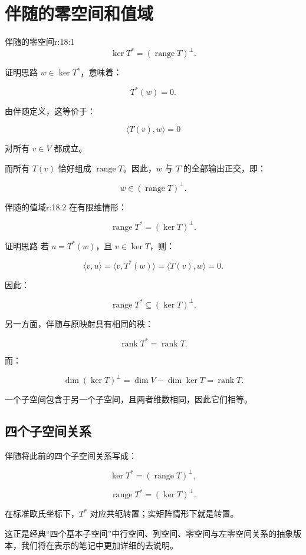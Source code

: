 
\chapter{伴随的零空间和值域}


\begin{jprop}{伴随的零空间}{r:18:1}
\[
\ker T^*
=
(\operatorname{range}T)^\perp.
\]
\end{jprop}

\begin{jproof}{证明思路}
$w\in\ker T^*$，意味着：

\[
T^*(w)=0.
\]

由伴随定义，这等价于：

\[
\langle T(v),w\rangle=0
\]

对所有 $v\in V$ 都成立。

而所有 $T(v)$ 恰好组成 $\operatorname{range}T$。因此，$w$ 与 $T$ 的全部输出正交，即：

\[
w\in(\operatorname{range}T)^\perp.
\]
\end{jproof}

\begin{jprop}{伴随的值域}{r:18:2}
在有限维情形：

\[
\operatorname{range}T^*
=
(\ker T)^\perp.
\]
\end{jprop}

\begin{jproof}{证明思路}
若 $u=T^*(w)$，且 $v\in\ker T$，则：

\[
\langle v,u\rangle
=
\langle v,T^*(w)\rangle
=
\langle T(v),w\rangle
=
0.
\]

因此：

\[
\operatorname{range}T^*
\subseteq
(\ker T)^\perp.
\]

另一方面，伴随与原映射具有相同的秩：

\[
\operatorname{rank}T^*=\operatorname{rank}T.
\]

而：

\[
\dim(\ker T)^\perp
=
\dim V-\dim\ker T
=
\operatorname{rank}T.
\]

一个子空间包含于另一个子空间，且两者维数相同，因此它们相等。
\end{jproof}

\section{四个子空间关系}

伴随将此前的四个子空间关系写成：

\[
\ker T^*
=
(\operatorname{range}T)^\perp,
\]

\[
\operatorname{range}T^*
=
(\ker T)^\perp.
\]

在标准欧氏坐标下，$T^*$ 对应共轭转置；实矩阵情形下就是转置。

这正是经典“四个基本子空间”中行空间、列空间、零空间与左零空间关系的抽象版本，我们将在表示的笔记中更加详细的去说明。
